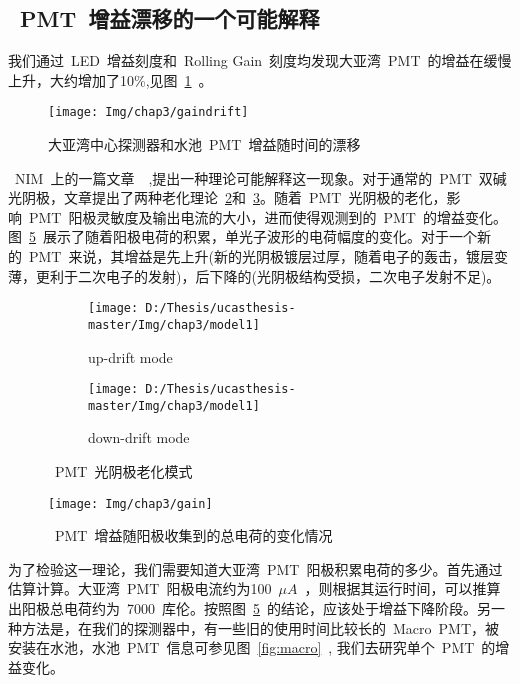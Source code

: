\subsection{~PMT~增益漂移的一个可能解释}
我们通过~LED~增益刻度和~Rolling Gain~刻度均发现大亚湾~PMT~的增益在缓慢上升，大约增加了10\%,见图~\ref{fig:gaindrift}~。
\begin{figure}[!htb]
  \centering
   \texttt{[image: Img/chap3/gaindrift]}
    \caption{ 大亚湾中心探测器和水池~PMT~增益随时间的漂移}
  \label{fig:gaindrift}
\end{figure}
~NIM~上的一篇文章~\citep{aiello2013aging}~,提出一种理论可能解释这一现象。对于通常的~PMT~双碱光阴极，文章提出了两种老化理论~\ref{fig:model_1}和~\ref{fig:model_2}。随着~PMT~光阴极的老化，影响~PMT~阳极灵敏度及输出电流的大小，进而使得观测到的~PMT~的增益变化。图~\ref{fig:gain}~展示了随着阳极电荷的积累，单光子波形的电荷幅度的变化。对于一个新的~PMT~来说，其增益是先上升(新的光阴极镀层过厚，随着电子的轰击，镀层变薄，更利于二次电子的发射)，后下降的(光阴极结构受损，二次电子发射不足)。
\begin{figure}[!htb]
  \centering
  \begin{subfigure}[b]{\MySubFactor\textwidth}
    \texttt{[image: D:/Thesis/ucasthesis-master/Img/chap3/model1]}
    \caption{up-drift mode}
    \label{fig:model_1}
  \end{subfigure}%
  \begin{subfigure}[b]{\MySubFactor\textwidth}
    \texttt{[image: D:/Thesis/ucasthesis-master/Img/chap3/model1]}
    \caption{down-drift mode}
    \label{fig:model_2}
  \end{subfigure}
\caption{~PMT~光阴极老化模式}
  \label{fig:model}
\end{figure}
\begin{figure}[!htb]
  \centering
   \texttt{[image: Img/chap3/gain]}
    \caption{ ~PMT~增益随阳极收集到的总电荷的变化情况}
  \label{fig:gain}
\end{figure}
为了检验这一理论，我们需要知道大亚湾~PMT~阳极积累电荷的多少。首先通过估算计算。大亚湾~PMT~阳极电流约为100~$\mu A$~，则根据其运行时间，可以推算出阳极总电荷约为~7000~库伦。按照图~\ref{fig:gain}~的结论，应该处于增益下降阶段。另一种方法是，在我们的探测器中，有一些旧的使用时间比较长的~Macro~PMT，被安装在水池，水池~PMT~信息可参见图~\ref{fig:macro}~, 我们去研究单个~PMT~的增益变化。

